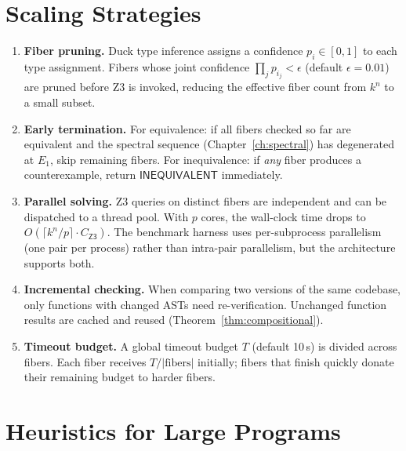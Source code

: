 \documentclass[11pt,a4paper]{report}
\theoremstyle{definition}
\theoremstyle{plain}
\begin{document}
\section{Scaling Strategies}

\begin{enumerate}
  \item \textbf{Fiber pruning.}
    Duck type inference assigns a confidence $p_i \in [0, 1]$ to each
    type assignment.  Fibers whose joint confidence
    $\prod_j p_{i_j} < \epsilon$ (default $\epsilon = 0.01$)
    are pruned before Z3 is invoked, reducing the effective fiber
    count from $k^n$ to a small subset.

  \item \textbf{Early termination.}
    For equivalence: if all fibers checked so far are equivalent and
    the spectral sequence (Chapter~\ref{ch:spectral}) has degenerated
    at $E_1$, skip remaining fibers.
    For inequivalence: if \emph{any} fiber produces a counterexample,
    return $\mathsf{INEQUIVALENT}$ immediately.

  \item \textbf{Parallel solving.}
    Z3 queries on distinct fibers are independent and can be
    dispatched to a thread pool.  With $p$ cores, the wall-clock
    time drops to $O(\lceil k^n / p \rceil \cdot C_\mathsf{Z3})$.
    The benchmark harness uses per-subprocess parallelism (one
    pair per process) rather than intra-pair parallelism, but the
    architecture supports both.

  \item \textbf{Incremental checking.}
    When comparing two versions of the same codebase, only functions
    with changed ASTs need re-verification.  Unchanged function
    results are cached and reused
    (Theorem~\ref{thm:compositional}).

  \item \textbf{Timeout budget.}
    A global timeout budget $T$ (default 10\,s) is divided across
    fibers.  Each fiber receives $T / |\mathrm{fibers}|$ initially;
    fibers that finish quickly donate their remaining budget to
    harder fibers.
\end{enumerate}

\section{Heuristics for Large Programs}
\end{document}
